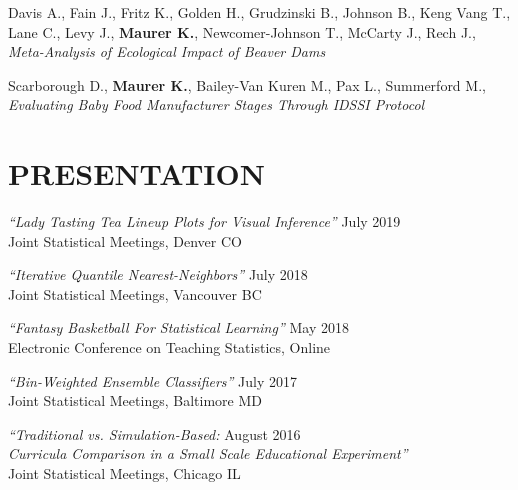 \documentclass[margin, 10pt]{res}\usepackage[]{graphicx}\usepackage[]{color}
\begin{document}
\begin{resume}
Davis A., Fain J., Fritz K., Golden H., Grudzinski B., Johnson B., Keng Vang T., Lane C., Levy J., \textbf{Maurer K.}, Newcomer-Johnson T., McCarty J., Rech J., {\it Meta-Analysis of Ecological Impact of Beaver Dams} 

Scarborough D., \textbf{Maurer K.}, Bailey-Van Kuren M., Pax L.{\bf *}, Summerford M.{\bf *}, {\it Evaluating Baby Food Manufacturer Stages Through IDSSI Protocol}  \\

%


\newpage

\section{PRESENTATION}

{\sl ``Lady Tasting Tea Lineup Plots for Visual Inference''} \hfill July 2019 \\
Joint Statistical Meetings, Denver CO

{\sl ``Iterative Quantile Nearest-Neighbors''} \hfill July 2018 \\
Joint Statistical Meetings, Vancouver BC

% 

{\sl ``Fantasy Basketball For Statistical Learning''} \hfill May 2018 \\
Electronic Conference on Teaching Statistics, Online

{\sl ``Bin-Weighted Ensemble Classifiers''} \hfill July 2017 \\
Joint Statistical Meetings, Baltimore MD

{\sl ``Traditional vs. Simulation-Based:} \hfill August 2016 \\
{\sl  Curricula Comparison in a Small Scale Educational Experiment''}\\
Joint Statistical Meetings, Chicago IL


\end{resume}
\end{document}
